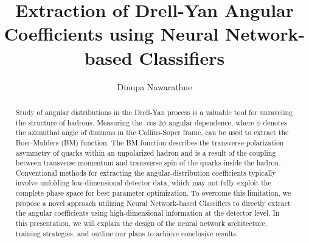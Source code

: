 \documentclass{article}
\title{Extraction of Drell-Yan Angular Coefficients using Neural Network-based Classifiers}
\author{Dinupa Nawarathne}
\begin{document}
\maketitle


\begin{abstract}
Study of angular distributions in the Drell-Yan process is a valuable tool for unraveling the structure of hadrons.
Measuring the $\cos2\phi$ angular dependence, where $\phi$ denotes the azimuthal angle of dimuons in the Collins-Soper
frame, can be used to extract the Boer-Mulders (BM) function. The BM function describes the transverse-polarization
asymmetry of quarks within an unpolarized hadron and is a result of the coupling between transverse momentum and
transverse spin of the quarks inside the hadron. Conventional methods for extracting the angular-distribution coefficients
typically involve unfolding low-dimensional detector data, which may not fully exploit the complete phase space for
best parameter optimization. To overcome this limitation, we propose a novel approach utilizing Neural Network-based
Classifiers to directly extract the angular coefficients using high-dimensional information at the detector level.
In this presentation, we will explain the design of the neural network architecture, training strategies, and outline
our plans to achieve conclusive results.
\end{abstract}
\end{document}
